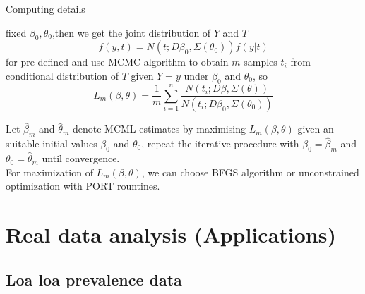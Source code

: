\documentclass[11pt,compress,UTF8]{beamer}
\begin{document}
\begin{frame}{Computing details}

fixed $\beta_{0},\theta_{0}$,then we get the joint distribution of $Y$ and $T$ 
$$f(y,t)=N(t;D\beta_{0},\Sigma(\theta_{0}))f(y|t)$$ for pre-defined and use MCMC algorithm
to obtain $m$ samples $t_{i}$ from conditional distribution of $T$ given $Y=y$ under $\beta_{0}$ and 
$\theta_{0}$, so $$L_{m}(\beta,\theta)=\frac{1}{m}\sum_{i=1}^{n}\frac{N(t_{i};D\beta,\Sigma(\theta))}{N(t_{i};D\beta_{0},\Sigma(\theta_{0}))}$$

Let $\hat{\beta}_{m}$ and $\hat{\theta}_{m}$ denote MCML estimates by maximising $L_{m}(\beta,\theta)$
given an suitable initial values $\beta_{0}$ and $\theta_{0}$, repeat the iterative procedure with 
$\beta_{0}=\hat{\beta}_{m}$ and $\theta_{0}=\hat{\theta}_{m}$ until convergence.\\

For maximization of $L_{m}(\beta,\theta)$, we can choose BFGS algorithm or unconstrained optimization with PORT rountines.
\end{frame}


\section{Real data analysis (Applications)}

\subsection{Loa loa prevalence data}
\end{document}
